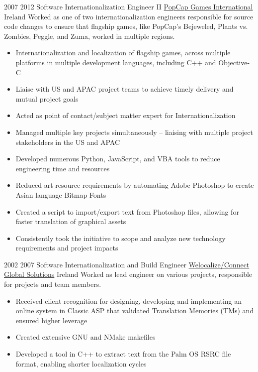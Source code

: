 \begin{twenty}
\twentyitem
      {2007} %
  {2012} %
    {Software Internationalization Engineer II} %
    {\href{https://www.popcap.com/}{PopCap Games International}} %
    {Ireland} %
    {Worked as one of two internationalization engineers responsible for source code changes to ensure that flagship games, like PopCap's Bejeweled, Plants vs. Zombies, Peggle, and Zuma, worked in multiple regions.} %
  {\begin{itemize}
    \item Internationalization and localization of flagship games, across multiple platforms in multiple development languages, including C++ and Objective-C
    \item Liaise with US and APAC project teams to achieve timely delivery and mutual project goals
    \item Acted as point of contact/subject matter expert for Internationalization
  \end{itemize}
  } %
  {\begin{itemize}
    \item Managed multiple key projects simultaneously – liaising with multiple project stakeholders in the US and APAC
    \item Developed numerous Python, JavaScript, and VBA tools to reduce engineering time and resources
    \item Reduced art resource requirements by automating Adobe Photoshop to create Asian language Bitmap Fonts
    \item Created a script to import/export text from Photoshop files, allowing for faster translation of graphical assets
    \item Consistently took the initiative to scope and analyze new technology requirements and project impacts
  \end{itemize}
  } %

\end{twenty}

\vspace{0.75\baselineskip}%

\begin{twenty}
\twentyitem
      {2002} %
  {2007} %
    {Software Internationalization and Build Engineer} %
    {\href{https://www.welocalize.com/}{Welocalize/Connect Global Solutions}} %
    {Ireland} %
    {Worked as lead engineer on various projects, responsible for projects and team members.} %
  {}
  {\begin{itemize}
    \item Received client recognition for designing, developing and implementing an online system in Classic ASP that validated Translation Memories (TMs) and ensured higher leverage
    \item Created extensive GNU and NMake makefiles
    \item Developed a tool in C++ to extract text from the Palm OS RSRC file format, enabling shorter localization cycles
    \end{itemize}
  }
\end{twenty}


